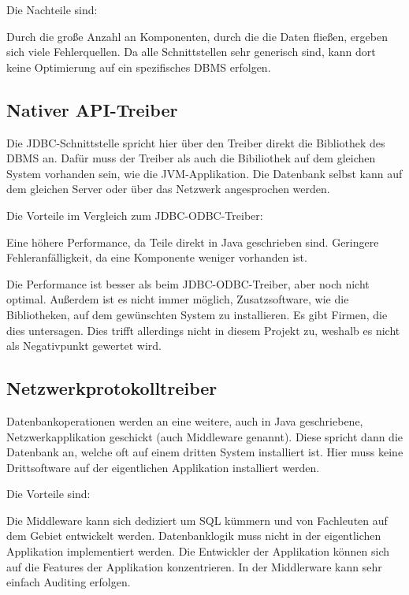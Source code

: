 Die Nachteile sind:

\begin{outline}
  \1 Durch die große Anzahl an Komponenten, durch die die Daten fließen,
  ergeben sich viele Fehlerquellen.
  \1 Da alle Schnittstellen sehr generisch sind, kann dort keine Optimierung
  auf ein spezifisches \gls{DBMS} erfolgen.
\end{outline}
\tm%

\subsection{Nativer API-Treiber}
Die \gls{JDBC}\hyp{}Schnittstelle spricht hier über den \gls{Treiber} direkt
die Bibliothek des \gls{DBMS} an. Dafür muss der \gls{Treiber} als auch die
Bibiliothek auf dem gleichen System vorhanden sein, wie die
\gls{JVM}\hyp{}Applikation. Die Datenbank selbst kann auf dem gleichen Server
oder über das Netzwerk angesprochen werden.

Die Vorteile im Vergleich zum \gls{JDBC}\hyp{}\gls{ODBC}\hyp{}\gls{Treiber}:

\begin{outline}
  \1 Eine höhere Performance, da Teile direkt in Java geschrieben sind.
  \1 Geringere Fehleranfälligkeit, da eine Komponente weniger vorhanden ist.
\end{outline}

Die Performance ist besser als beim
\gls{JDBC}\hyp{}\gls{ODBC}\hyp{}\gls{Treiber}, aber noch nicht optimal.
Außerdem ist es nicht immer möglich, Zusatzsoftware, wie die Bibliotheken,
auf dem gewünschten System zu installieren. Es gibt Firmen, die dies
untersagen. Dies trifft allerdings nicht in diesem Projekt zu, weshalb es
nicht als Negativpunkt gewertet wird.
\tm%

\subsection{Netzwerkprotokolltreiber}
Datenbankoperationen werden an eine weitere, auch in Java geschriebene,
Netzwerkapplikation geschickt (auch \gls{Middleware} genannt). Diese spricht
dann die Datenbank an, welche oft auf einem dritten System installiert ist.
Hier muss keine Drittsoftware auf der eigentlichen Applikation installiert
werden.

Die Vorteile sind:

\begin{outline}
  \1 Die \gls{Middleware} kann sich dediziert um \gls{SQL} kümmern und von
  Fachleuten auf dem Gebiet entwickelt werden.
  \1 Datenbanklogik muss nicht in der eigentlichen Applikation implementiert
  werden. Die Entwickler der Applikation können sich auf die Features der
  Applikation konzentrieren.
  \1 In der Middlerware kann sehr einfach Auditing erfolgen.
\end{outline}

